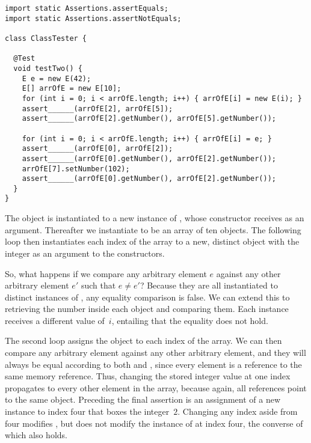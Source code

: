 \begin{lstlisting}[language=MyJava]
import static Assertions.assertEquals;
import static Assertions.assertNotEquals;

class ClassTester {

  @Test
  void testTwo() {
    E e = new E(42);
    E[] arrOfE = new E[10];
    for (int i = 0; i < arrOfE.length; i++) { arrOfE[i] = new E(i); }
    assert______(arrOfE[2], arrOfE[5]);
    assert______(arrOfE[2].getNumber(), arrOfE[5].getNumber());

    for (int i = 0; i < arrOfE.length; i++) { arrOfE[i] = e; }
    assert______(arrOfE[0], arrOfE[2]);
    assert______(arrOfE[0].getNumber(), arrOfE[2].getNumber());
    arrOfE[7].setNumber(102);
    assert______(arrOfE[0].getNumber(), arrOfE[2].getNumber());
  }
}
\end{lstlisting}

The object  is instantiated to a new instance of , whose constructor receives  as an argument. Thereafter we instantiate  to be an array of ten  objects. The following loop then instantiates each index of the array to a new, distinct  object with the integer  as an argument to the constructors.

So, what happens if we compare any arbitrary element $e$ against any other arbitrary element $e'$ such that $e \neq e'$? Because they are all instantiated to distinct instances of , any equality comparison is false. We can extend this to retrieving the number inside each  object and comparing them. Each  instance receives a different value of~$i$, entailing that the equality does not hold.

The second loop assigns the  object to each index of the array. 
We can then compare any arbitrary element against any other arbitrary element, and they will always be equal according to both \ttt{==} and , since every element is a reference to the same memory reference. 
Thus, changing the stored integer value at one index propagates to every other element in the array, because again, all references point to the same object.
Preceding the final assertion is an assignment of a new  instance to index four that boxes the integer~$2$. 
Changing any index aside from four modifies , but does not modify the instance of  at index four, the converse of which also holds.



